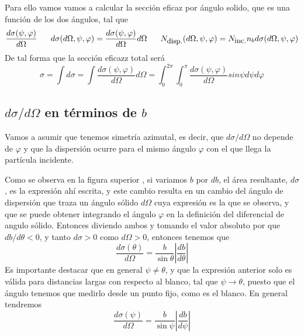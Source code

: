 Para ello vamos vamos a calcular la sección eficaz por ángulo solido, que es una función de los dos ángulos, tal que
\begin{equation} \label{6.1.1}
    \frac{d\sigma(\psi,\varphi)}{d\Omega}\ \ \ \ \ d\sigma(d\Omega, \psi,\varphi) = \frac{d\sigma(\psi,\varphi)}{d\Omega} d\Omega \ \ \ \ \ N_{\mbox{\small disp.}}(d\Omega, \psi,\varphi) = N_{\mbox{\small inc.}} n_b d\sigma(d\Omega, \psi,\varphi)
\end{equation} 
De tal forma que la sección eficazz total será 
\begin{equation} \label{6.1.1}
    \sigma = \int d\sigma = \int \frac{d\sigma(\psi,\varphi)}{d\Omega} d\Omega = \int_0^{2\pi}\int_0^\pi \frac{d\sigma(\psi,\varphi)}{d\Omega} sin\psi d\psi d\varphi
\end{equation} 
\subsection{$d\sigma/d\Omega$ en términos de $b$}
Vamos a asumir que tenemos simetría azimutal, es decir, que $d\sigma/d\Omega$ no depende de $\varphi$ y que la dispersión ocurre para el mismo ángulo $\varphi$ con el que llega la partícula incidente.
\vspace{-15pt}
\begin{figure}[H]
    \def\svgwidth{8 cm}
    \normalsize
	
\end{figure}
\vspace{-15pt}
Como se observa en la figura superior , si variamos $b$ por $db$, el área resultante, $d\sigma$, es la expresión ahí escrita, y este cambio resulta en un cambio del ángulo de dispersión que traza un ángulo sólido $d\Omega$ cuya expresión es la que se observa, y que se puede obtener integrando el ángulo $\varphi$ en la definición del diferencial de angulo sólido. Entonces diviendo ambos y tomando el valor absoluto por que $db/d\theta <0$, y tanto $d\sigma>0$ como $d\Omega>0$, entonces tenemos que 
\begin{equation} \label{6.1.1}
    \frac{d\sigma(\theta)}{d\Omega} = \frac{b}{\sin\theta}\left|\frac{db}{d\theta}\right|
\end{equation} 
Es importante destacar que en general $\psi \neq \theta$, y que la expresión anterior solo es válida  para distancias largas con respecto al blanco, tal que $\psi \rightarrow \theta$, puesto que el ángulo tenemos que medirlo desde un punto fijo, como es el blanco. En general tendremos
\begin{equation} \label{6.1.1}
    \frac{d\sigma(\psi)}{d\Omega} = \frac{b}{\sin\psi}\left|\frac{db}{d\psi}\right|
\end{equation} 

